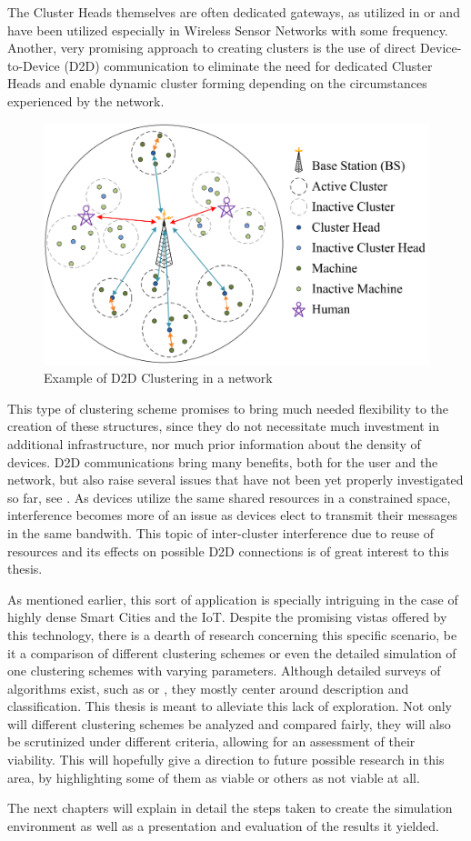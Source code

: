The Cluster Heads themselves are often dedicated gateways, as utilized in \cite{Niyato2011} or \cite{Shariatmadari2015} and have been utilized especially in Wireless Sensor Networks with some frequency. Another, very promising approach to creating clusters is the use of direct Device-to-Device (D2D) communication to eliminate the need for dedicated Cluster Heads and enable dynamic cluster forming depending on the circumstances experienced by the network.

\begin{figure}[!h]
\centering
\includegraphics[scale = 0.25]{figures/D2D_clustering}
\caption{Example of D2D Clustering in a network \cite{Wang2013}}
\end{figure}

This type of clustering scheme promises to bring much needed flexibility to the creation of these structures, since they do not necessitate much investment in additional infrastructure, nor much prior information about the density of devices. D2D communications bring many benefits, both for the user and the network, but also raise several issues that have not been yet properly investigated so far, see \cite{Klugel2014}. As devices utilize the same shared resources in a constrained space, interference becomes more of an issue as devices elect to transmit their messages in the same bandwith. This topic of inter-cluster interference due to reuse of resources and its effects on possible D2D connections is of great interest to this thesis. 

As mentioned earlier, this sort of application is specially intriguing in the case of highly dense Smart Cities and the IoT. Despite the promising vistas offered by this technology, there is a dearth of research concerning this specific scenario, be it a comparison of different clustering schemes or even the detailed simulation of one clustering schemes with varying parameters. Although detailed surveys of algorithms exist, such as \cite{Jiang2009} or \cite{Afsar2014}, they mostly center around description and classification. This thesis is meant to alleviate this lack of exploration. Not only will different clustering schemes be analyzed and compared fairly, they will also be scrutinized under different criteria, allowing for an assessment of their viability. This will hopefully give a direction to future possible research in this area, by highlighting some of them as viable or others as not viable at all.


The next chapters will explain in detail the steps taken to create the simulation environment as well as a presentation and evaluation of the results it yielded.